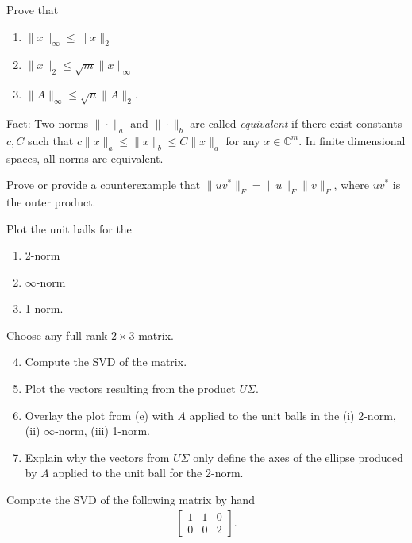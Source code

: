 \documentclass{ximera}
\begin{document}
\begin{exercise}
    Prove that
    \begin{enumerate}
        \item $\|x\|_\infty \leq \|x\|_2$
        \item $\|x\|_2 \leq \sqrt{m}\|x\|_\infty$
        \item $\|A\|_\infty\leq \sqrt{n}\|A\|_2$.
    \end{enumerate}
    Fact: Two norms $\|\cdot\|_a$ and $\|\cdot\|_b$ are called \textit{equivalent} if there exist constants $c, C$ such that $c\|x\|_a \leq \|x\|_b \leq C\|x\|_a$ for any $x \in \mathbb{C}^m$.  In finite dimensional spaces, all norms are equivalent.
\end{exercise}

\begin{exercise}
    Prove or provide a counterexample that $\|uv^*\|_F = \|u\|_F\|v\|_F$, where $uv^*$ is the outer product.
\end{exercise}

\begin{exercise}
    Plot the unit balls for the 
    \begin{enumerate}
        \item 2-norm
        \item $\infty$-norm
        \item 1-norm.
    \end{enumerate}
    Choose any full rank $2 \times 3$ matrix.  
    \begin{enumerate}
    \setcounter{enumi}{3}
        \item Compute the SVD of the matrix.
        \item Plot the vectors resulting from the product $U\Sigma$.
        \item Overlay the plot from (e) with $A$ applied to the unit balls in the (i) 2-norm, (ii) $\infty$-norm, (iii) 1-norm. 
        \item Explain why the vectors from $U\Sigma$ only define the axes of the ellipse produced by $A$ applied to the unit ball for the 2-norm.
    \end{enumerate}
\end{exercise}

\begin{exercise}
    Compute the SVD of the following matrix by hand
    \begin{align*}
        \begin{bmatrix}
            1 & 1 & 0 \\ 0 & 0 & 2
        \end{bmatrix}.
    \end{align*}
\end{exercise}
\end{document}

